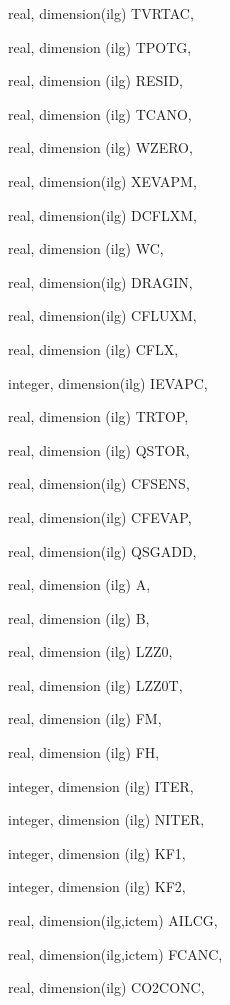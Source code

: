 {\begin{DoxyParamCaption}
\item[{real, dimension(ilg)}]{T\+V\+R\+T\+A\+C, }
\item[{real, dimension (ilg)}]{T\+P\+O\+T\+G, }
\item[{real, dimension (ilg)}]{R\+E\+S\+I\+D, }
\item[{real, dimension (ilg)}]{T\+C\+A\+N\+O, }
\item[{real, dimension (ilg)}]{W\+Z\+E\+R\+O, }
\item[{real, dimension(ilg)}]{X\+E\+V\+A\+P\+M, }
\item[{real, dimension(ilg)}]{D\+C\+F\+L\+X\+M, }
\item[{real, dimension    (ilg)}]{W\+C, }
\item[{real, dimension(ilg)}]{D\+R\+A\+G\+I\+N, }
\item[{real, dimension(ilg)}]{C\+F\+L\+U\+X\+M, }
\item[{real, dimension  (ilg)}]{C\+F\+L\+X, }
\item[{integer, dimension(ilg)}]{I\+E\+V\+A\+P\+C, }
\item[{real, dimension (ilg)}]{T\+R\+T\+O\+P, }
\item[{real, dimension (ilg)}]{Q\+S\+T\+O\+R, }
\item[{real, dimension(ilg)}]{C\+F\+S\+E\+N\+S, }
\item[{real, dimension(ilg)}]{C\+F\+E\+V\+A\+P, }
\item[{real, dimension(ilg)}]{Q\+S\+G\+A\+D\+D, }
\item[{real, dimension     (ilg)}]{A, }
\item[{real, dimension     (ilg)}]{B, }
\item[{real, dimension  (ilg)}]{L\+Z\+Z0, }
\item[{real, dimension (ilg)}]{L\+Z\+Z0\+T, }
\item[{real, dimension    (ilg)}]{F\+M, }
\item[{real, dimension    (ilg)}]{F\+H, }
\item[{integer, dimension  (ilg)}]{I\+T\+E\+R, }
\item[{integer, dimension (ilg)}]{N\+I\+T\+E\+R, }
\item[{integer, dimension   (ilg)}]{K\+F1, }
\item[{integer, dimension   (ilg)}]{K\+F2, }
\item[{real, dimension(ilg,ictem)}]{A\+I\+L\+C\+G, }
\item[{real, dimension(ilg,ictem)}]{F\+C\+A\+N\+C, }
\item[{real, dimension(ilg)}]{C\+O2\+C\+O\+N\+C, }

\end{DoxyParamCaption}}
